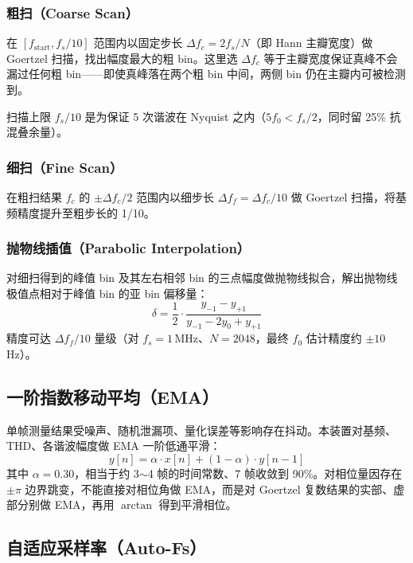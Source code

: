 \documentclass[a4paper]{article}
\begin{document}
	\subsubsection{粗扫（Coarse Scan）}
	在 $[f_{\text{start}}, f_s/10]$ 范围内以固定步长 $\Delta f_c = 2 f_s / N$（即 Hann 主瓣宽度）做 Goertzel 扫描，找出幅度最大的粗 bin。这里选 $\Delta f_c$ 等于主瓣宽度保证真峰不会漏过任何粗 bin——即使真峰落在两个粗 bin 中间，两侧 bin 仍在主瓣内可被检测到。

	扫描上限 $f_s/10$ 是为保证 5 次谐波在 Nyquist 之内（$5 f_0 < f_s/2$，同时留 25\% 抗混叠余量）。

	\subsubsection{细扫（Fine Scan）}
	在粗扫结果 $f_c$ 的 $\pm \Delta f_c / 2$ 范围内以细步长 $\Delta f_f = \Delta f_c / 10$ 做 Goertzel 扫描，将基频精度提升至粗步长的 1/10。

	\subsubsection{抛物线插值（Parabolic Interpolation）}
	对细扫得到的峰值 bin 及其左右相邻 bin 的三点幅度做抛物线拟合，解出抛物线极值点相对于峰值 bin 的亚 bin 偏移量：
	\begin{equation}
		\delta = \frac{1}{2} \cdot \frac{y_{-1} - y_{+1}}{y_{-1} - 2 y_0 + y_{+1}}
	\end{equation}
	精度可达 $\Delta f_f / 10$ 量级（对 $f_s = 1$\,MHz、$N = 2048$，最终 $f_0$ 估计精度约 $\pm 10$\,Hz）。

	\subsection{一阶指数移动平均（EMA）}

	单帧测量结果受噪声、随机泄漏项、量化误差等影响存在抖动。本装置对基频、THD、各谐波幅度做 EMA 一阶低通平滑：
	\begin{equation}
		y[n] = \alpha \cdot x[n] + (1 - \alpha) \cdot y[n-1]
	\end{equation}
	其中 $\alpha = 0.30$，相当于约 3$\sim$4 帧的时间常数、7 帧收敛到 90\%。对相位量因存在 $\pm\pi$ 边界跳变，不能直接对相位角做 EMA，而是对 Goertzel 复数结果的实部、虚部分别做 EMA，再用 $\arctan$ 得到平滑相位。

	\subsection{自适应采样率（Auto-Fs）}
\end{document}

